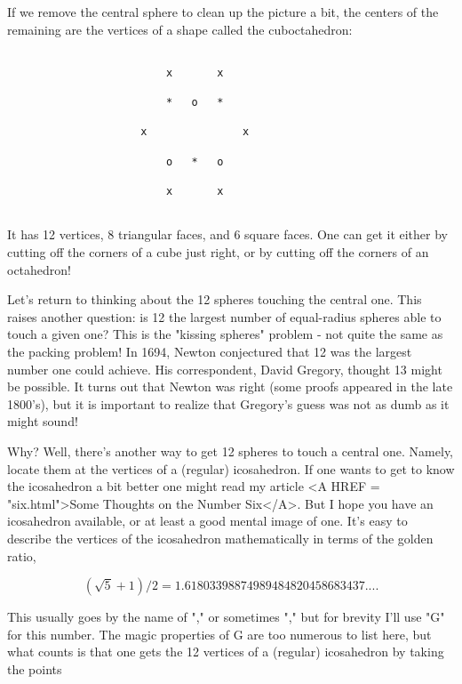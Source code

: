                         
If we remove the central sphere to clean up the picture a bit, the
centers of the remaining are the vertices of a shape called the
cuboctahedron:



\begin{verbatim}

                         x       x   

                         *   o   * 
 
                     x               x

                         o   *   o

                         x       x
                         
\end{verbatim}
    
      
It has 12 vertices, 8 triangular faces, and 6 square faces.  One can get
it either by cutting off the corners of a cube just right, or by cutting
off the corners of an octahedron!

Let's return to thinking about the 12 spheres touching the central one.
This raises another question: is 12 the largest number of equal-radius
spheres able to touch a given one?  This is the "kissing spheres"
problem - not quite the same as the packing problem!  In 1694, Newton
conjectured that 12 was the largest number one could achieve.  His
correspondent, David Gregory, thought 13 might be possible.  It turns
out that Newton was right (some proofs appeared in the late 1800's), but
it is important to realize that Gregory's guess was not as dumb as it
might sound!

Why?  Well, there's another way to get 12 spheres to touch a central
one.  Namely, locate them at the vertices of a (regular) icosahedron.  If one
wants to get to know the icosahedron a bit better one might read my
article <A HREF = "six.html">Some Thoughts on the Number Six</A>.
But I hope you have an icosahedron available, or at least a good mental
image of one.  It's easy to describe the vertices of the icosahedron
mathematically in terms of the golden ratio, 


$$

 (\sqrt 5 + 1)/2 = 1.61803398874989484820458683437....
$$
    
            
This usually goes by the name of "\phi ," or sometimes "\tau ," but for
brevity I'll use "G" for this number.  The magic properties of G are too
numerous to list here, but what counts is that one gets the 12 vertices
of a (regular) icosahedron by taking the points



